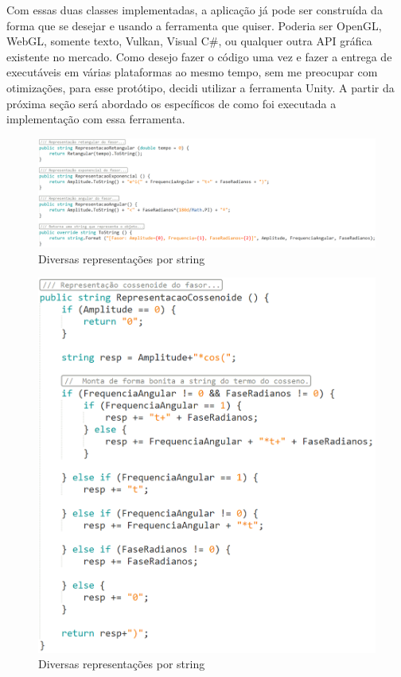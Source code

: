 \documentclass[conference,harvard, brazil]{sbatex}
\begin{document}
	Com essas duas classes implementadas, a aplicação já pode ser construída da forma que se desejar e usando a ferramenta que quiser. Poderia ser OpenGL, WebGL, somente texto, Vulkan, Visual C\#, ou qualquer outra API gráfica existente no mercado. Como desejo fazer o código uma vez e fazer a entrega de executáveis em várias plataformas ao mesmo tempo, sem me preocupar com otimizações, para esse protótipo, decidi utilizar a ferramenta Unity. A partir da próxima seção será abordado os específicos de como foi executada a implementação com essa ferramenta.
	\begin{figure}[h]
		\includegraphics[width=\columnwidth]{fasor_3}
		\caption{Diversas representações por string}
		\label{fig:fasor_str_2}
	\end{figure}
	\begin{figure}[h]
		\includegraphics[width=\columnwidth]{fasor_2}
		\caption{Diversas representações por string}
		\label{fig:fasor_str_1}
	\end{figure}
	
\end{document}
